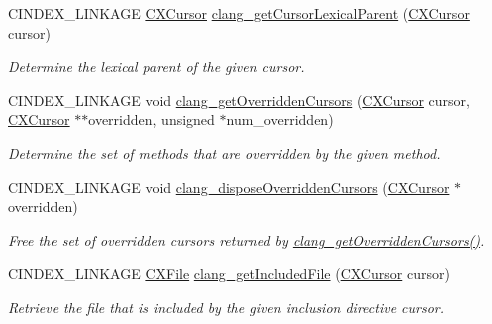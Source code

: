 \begin{DoxyCompactItemize}
C\+I\+N\+D\+E\+X\+\_\+\+L\+I\+N\+K\+A\+GE \mbox{\hyperlink{structCXCursor}{C\+X\+Cursor}} \mbox{\hyperlink{group__CINDEX__CURSOR__MANIP_gace7a423874d72b3fdc71d6b0f31830dd}{clang\+\_\+get\+Cursor\+Lexical\+Parent}} (\mbox{\hyperlink{structCXCursor}{C\+X\+Cursor}} cursor)
\begin{DoxyCompactList}\small\item\em Determine the lexical parent of the given cursor. \end{DoxyCompactList}\item 
C\+I\+N\+D\+E\+X\+\_\+\+L\+I\+N\+K\+A\+GE void \mbox{\hyperlink{group__CINDEX__CURSOR__MANIP_gac308b03420c550e00c61153dc63deac8}{clang\+\_\+get\+Overridden\+Cursors}} (\mbox{\hyperlink{structCXCursor}{C\+X\+Cursor}} cursor, \mbox{\hyperlink{structCXCursor}{C\+X\+Cursor}} $\ast$$\ast$overridden, unsigned $\ast$num\+\_\+overridden)
\begin{DoxyCompactList}\small\item\em Determine the set of methods that are overridden by the given method. \end{DoxyCompactList}\item 
\mbox{\label{group__CINDEX__CURSOR__MANIP_gac8f259af871b3f34ca7150703f8aaaa8}} 
C\+I\+N\+D\+E\+X\+\_\+\+L\+I\+N\+K\+A\+GE void \mbox{\hyperlink{group__CINDEX__CURSOR__MANIP_gac8f259af871b3f34ca7150703f8aaaa8}{clang\+\_\+dispose\+Overridden\+Cursors}} (\mbox{\hyperlink{structCXCursor}{C\+X\+Cursor}} $\ast$overridden)
\begin{DoxyCompactList}\small\item\em Free the set of overridden cursors returned by {\ttfamily \mbox{\hyperlink{group__CINDEX__CURSOR__MANIP_gac308b03420c550e00c61153dc63deac8}{clang\+\_\+get\+Overridden\+Cursors()}}}. \end{DoxyCompactList}\item 
\mbox{\label{group__CINDEX__CURSOR__MANIP_gaf61979977343e39f21d6ea0b22167514}} 
C\+I\+N\+D\+E\+X\+\_\+\+L\+I\+N\+K\+A\+GE \mbox{\hyperlink{group__CINDEX__FILES_gacfcea9c1239c916597e2e5b3e109215a}{C\+X\+File}} \mbox{\hyperlink{group__CINDEX__CURSOR__MANIP_gaf61979977343e39f21d6ea0b22167514}{clang\+\_\+get\+Included\+File}} (\mbox{\hyperlink{structCXCursor}{C\+X\+Cursor}} cursor)
\begin{DoxyCompactList}\small\item\em Retrieve the file that is included by the given inclusion directive cursor. \end{DoxyCompactList}\end{DoxyCompactItemize}


